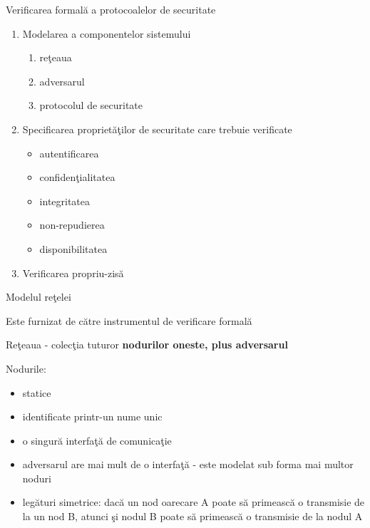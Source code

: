 \documentclass{beamer}
\begin{document}
\begin{frame}{Verificarea formală a protocoalelor de securitate}
\begin{enumerate}
\item
Modelarea a componentelor sistemului
\begin{enumerate}
\item
reţeaua
\item
adversarul
\item
protocolul de securitate
\end{enumerate}
\item
Specificarea proprietăţilor de securitate care trebuie verificate
\begin{itemize}
\item
autentificarea
\item
confidenţialitatea
\item
integritatea
\item
non-repudierea
\item
disponibilitatea
\end{itemize}
\item
Verificarea propriu-zisă
\end{enumerate}
\end{frame}



\begin{frame}{Modelul reţelei}

Este furnizat de către instrumentul de verificare formală

\vspace{0.5cm}

Reţeaua - colecţia tuturor \textbf{nodurilor oneste, plus adversarul}

Nodurile:
\begin{itemize}
\item
statice
\item
identificate printr-un nume unic
\item
o singură interfaţă de comunicaţie
\item
adversarul are mai mult de o interfaţă - este modelat sub forma mai multor noduri
\item
legături simetrice: dacă un nod oarecare A poate să primească o transmisie de la un nod B, atunci şi nodul B poate să primească o transmisie de la nodul A
\end{itemize}

\end{frame}
\end{document}
